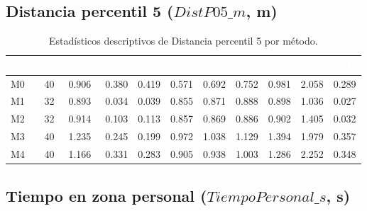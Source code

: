 \documentclass[12pt,a4paper,oneside]{book}
\begin{document}
\subsection{Distancia percentil 5 ($\textit{DistP05\_m}$, m)}

\begin{table}[H]
\centering
\caption{Estadísticos descriptivos de Distancia percentil 5 por método.}
\renewcommand{\arraystretch}{1.25}
\small
\begin{tabular}{lcccccccccc}
\toprule
\rowcolor{primary}
\textcolor{white}{\textbf{Mét.}} & \textcolor{white}{\textbf{n}} & \textcolor{white}{\textbf{Media}} & \textcolor{white}{\textbf{SD}} & \textcolor{white}{\textbf{CV}} & \textcolor{white}{\textbf{Mín}} & \textcolor{white}{\textbf{Q25}} & \textcolor{white}{\textbf{Med}} & \textcolor{white}{\textbf{Q75}} & \textcolor{white}{\textbf{Máx}} & \textcolor{white}{\textbf{IQR}} \\
\midrule
M0 & 40 & 0.906 & 0.380 & 0.419 & 0.571 & 0.692 & 0.752 & 0.981 & 2.058 & 0.289 \\
M1 & 32 & 0.893 & 0.034 & 0.039 & 0.855 & 0.871 & 0.888 & 0.898 & 1.036 & 0.027 \\
M2 & 32 & 0.914 & 0.103 & 0.113 & 0.857 & 0.869 & 0.886 & 0.902 & 1.405 & 0.032 \\
M3 & 40 & 1.235 & 0.245 & 0.199 & 0.972 & 1.038 & 1.129 & 1.394 & 1.979 & 0.357 \\
M4 & 40 & 1.166 & 0.331 & 0.283 & 0.905 & 0.938 & 1.003 & 1.286 & 2.252 & 0.348 \\
\bottomrule
\end{tabular}
\end{table}

\subsection{Tiempo en zona personal ($\textit{TiempoPersonal\_s}$, s)}
\end{document}

